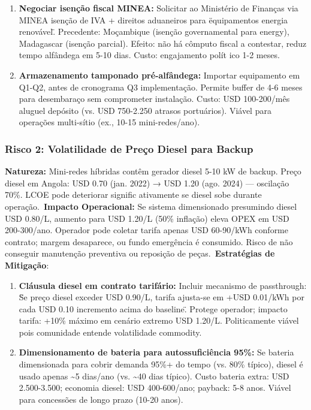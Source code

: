 \documentclass[12pt, a4paper]{article}
\begin{document}
\begin{enumerate}
\item\textbf{Negociar isenção fiscal MINEA:} Solicitar ao Ministério de Finanças via MINEA isenção de IVA + direitos aduaneiros para \"equipamentos energia renovável\". Precedente: Moçambique (isenção governamental para energy), Madagascar (isenção parcial). Efeito: não há cômputo fiscal a contestar, reduz tempo alfândega em 5-10 dias. Custo: engajamento polít ico 1-2 meses.\

\item\textbf{Armazenamento tamponado pré-alfândega:} Importar equipamento em Q1-Q2, antes de cronograma Q3 implementação. Permite buffer de 4-6 meses para desembaraço sem comprometer instalação. Custo: USD 100-200/mês aluguel depósito (vs. USD 750-2.250 atrasos portuários). Viável para operações multi-sítio (ex., 10-15 mini-redes/ano).\
\end{enumerate}

\subsubsection{Risco 2: Volatilidade de Preço Diesel para Backup}
\textbf{Natureza:} Mini-redes híbridas contêm gerador diesel 5-10 kW de backup. Preço diesel em Angola: USD 0.70 (jan. 2022) → USD 1.20 (ago. 2024) — oscilação 70\%. LCOE pode deteriorar signific ativamente se diesel sobe durante operação.\
\textbf{Impacto Operacional:} Se sistema dimensionado presumindo diesel USD 0.80/L, aumento para USD 1.20/L (50\% inflação) eleva OPEX em USD 200-300/ano. Operador pode coletar tarifa apenas USD 60-90/kWh conforme contrato; margem desaparece, ou fundo emergência é consumido. Risco de não conseguir manutenção preventiva ou reposição de peças.\
\textbf{Estratégias de Mitigação}:\
\begin{enumerate}
\item\textbf{Cláusula diesel em contrato tarifário:} Incluir mecanismo de passthrough: \"Se preço diesel exceder USD 0.90/L, tarifa ajusta-se em +USD 0.01/kWh por cada USD 0.10 incremento acima do baseline\". Protege operador; impacto tarifa: +10\% máximo em cenário extremo USD 1.20/L. Politicamente viável pois comunidade entende volatilidade commodity.\

\item\textbf{Dimensionamento de bateria para autossuficiência 95\%:} Se bateria dimensionada para cobrir demanda 95\%+ do tempo (vs. 80\% típico), diesel é usado apenas \textasciitilde{}5 dias/ano (vs. \textasciitilde{}40 dias típico). Custo bateria extra: USD 2.500-3.500; economia diesel: USD 400-600/ano; payback: 5-8 anos. Viável para concessões de longo prazo (10-20 anos).\
\end{enumerate}
\end{document}
